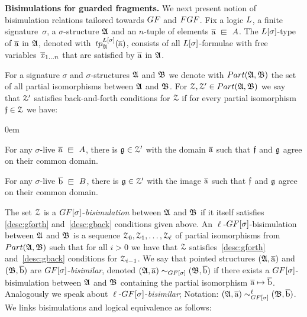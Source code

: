 \documentclass[a4paper,UKenglish,cleveref, autoref, thm-restate, hideLIPIcs]{lipics-v2021}
\begin{document}

\noindent \textbf{Bisimulations for guarded fragments.}
%
We next present notion of bisimulation relations tailored towards $\GF$ and $\FGF$.
Fix a logic $\logicL$, a finite signature~$\sigma$, a $\sigma$-structure ${\mathfrak{A}}$ and an $n$-tuple of elements $\elemtuplea \sqin A$. 
The $\logicL[\sigma]$-type of $\overline{\mathrm{a}}$ in ${\mathfrak{A}}$, denoted with~$\tp{\logicL[\sigma]}{\str{A}}{\elemtuplea}$, consists of all $\logicL[\sigma]$-formulae with free variables~$\overline{\mathit{x}}_{1\ldots n}$ that are satisfied by $\overline{\mathrm{a}}$ in ${\mathfrak{A}}$. 

For a signature $\sigma$ and $\sigma$-structures ${\mathfrak{A}}$ and ${\mathfrak{B}}$ we denote with $\PartIso{\str{A}}{\str{B}}$ the set of all partial isomorphisms between ${\mathfrak{A}}$ and ${\mathfrak{B}}$. 
For $\bisimZ, \bisimZ' \in \PartIso{\str{A}}{\str{B}}$ we say that $\mathcal{Z}'$ satisfies back-and-forth conditions for $\mathcal{Z}$ if for every partial isomorphism $\mathfrak{f} \in \mathcal{Z}$ we have:
%
\begin{description}\itemsep0em
  \item[\desclabel{(gForth)}{desc:gforth}] For any $\sigma$-live $\elemtuplea \sqin A$, there is $\mathfrak{g} \in \mathcal{Z}'$ with the domain $\overline{\mathrm{a}}$ such that $\mathfrak{f}$ and $\mathfrak{g}$ agree on their common domain. 
  \item[\desclabel{(gBack)}{desc:gback}] For any $\sigma$-live $\elemtupleb \sqin B$, there is $\mathfrak{g} \in \mathcal{Z}'$ with the image $\overline{\mathrm{a}}$ such that $\mathfrak{f}$ and $\mathfrak{g}$ agree on their common domain. 
\end{description}
The set $\mathcal{Z}$ is a $\GF[\sigma]$-\emph{bisimulation} between ${\mathfrak{A}}$ and ${\mathfrak{B}}$ if it itself satisfies \ref{desc:gforth} and~\ref{desc:gback} conditions given above.
An $\ell$-$\GF[\sigma]$-bisimulation between ${\mathfrak{A}}$ and ${\mathfrak{B}}$ is a sequence $\mathcal{Z}_0, \mathcal{Z}_1, \ldots, \mathcal{Z}_\ell$ of partial isomorphisms from $\PartIso{\str{A}}{\str{B}}$ such that for all $i > 0$ we have that $\mathcal{Z}$ satisfies~\ref{desc:gforth} and~\ref{desc:gback} conditions for $\mathcal{Z}_{i{-}1}$.
We say that pointed structures $({\mathfrak{A}}, \overline{\mathrm{a}})$ and $({\mathfrak{B}}, \overline{\mathrm{b}})$ are $\GF[\sigma]$-\emph{bisimilar}, denoted $(\str{A}, \elemtuplea) \bisimto_{\GF[\sigma]} (\str{B}, \elemtupleb)$ if there exists a $\GF[\sigma]$-bisimulation  between ${\mathfrak{A}}$ and ${\mathfrak{B}}$ containing the partial isomorphism $\overline{\mathrm{a}} \mapsto \overline{\mathrm{b}}$.
Analogously we speak about $\ell$-$\GF[\sigma]$-\emph{bisimilar}; Notation: $(\str{A}, \elemtuplea) \bisimto_{\GF[\sigma]}^{\ell} (\str{B}, \elemtupleb)$.
We links bisimulations and logical equivalence as follows:
\end{document}
